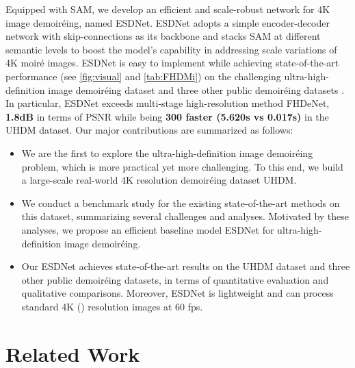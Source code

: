 \documentclass[runningheads]{llncs}
\begin{document}
Equipped with SAM, we develop an efficient and scale-robust network for 4K image demoiréing, named ESDNet. ESDNet adopts a simple encoder-decoder network with skip-connections as its backbone and stacks SAM at different semantic levels to boost the model's capability in addressing scale variations of 4K moiré images. ESDNet is easy to implement while achieving state-of-the-art performance (see \cref{fig:visual} and \cref{tab:FHDMi}) on the challenging ultra-high-definition image demoiréing dataset and three other public demoiréing datasets \cite{he2020fhde,yuan2019aim,sun2018moire}.
In particular, ESDNet exceeds multi-stage high-resolution method FHDeNet, \textbf{1.8dB} in terms of PSNR while being \textbf{300 faster (5.620s vs 0.017s)} 
in the UHDM dataset. Our major contributions are summarized as follows:
\begin{itemize}
  \item We are the first to explore the ultra-high-definition image demoiréing problem, which is more practical yet more challenging. To this end, we build a large-scale real-world 4K resolution demoiréing dataset UHDM. 
  \item We conduct a benchmark study for the existing state-of-the-art methods on this dataset, summarizing several challenges and analyses. Motivated by these analyses, we propose an efficient baseline model ESDNet for ultra-high-definition image demoiréing.
  \item Our ESDNet achieves state-of-the-art results on the UHDM dataset and three other public demoiréing datasets, in terms of quantitative evaluation and qualitative comparisons. Moreover, ESDNet is lightweight and can process standard 4K () resolution images at 60 fps.
\end{itemize}





\section{Related Work} 
\end{document}
